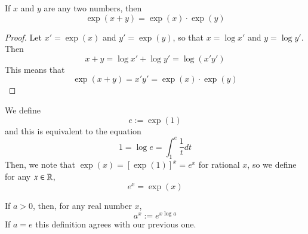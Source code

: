 \documentclass[12pt, a4paper, oneside, openright, titlepage]{book}
\begin{document}
\begin{subappendices}
    \begin{thm}
        If $x$ and $y$ are any two numbers, then \begin{equation*}
            \exp(x+y) = \exp(x)\cdot \exp(y)
        \end{equation*}
    \end{thm}
    \begin{proof}
        Let $x' = \exp(x)$ and $y' = \exp(y)$, so that $x = \log x'$ and $y = \log y'$. Then \begin{equation*}
            x+y = \log x' + \log y' = \log(x'y')
        \end{equation*}
        This means that \begin{equation*}
            \exp(x+y) = x'y' = \exp(x) \cdot \exp(y)
        \end{equation*}
    \end{proof}


    \begin{defn}
        We define \begin{equation}
            e := \exp(1)
        \end{equation}
        and this is equivalent to the equation \begin{equation}
            1 = \log e = \int_1^e\frac{1}{t}dt
        \end{equation}
        Then, we note that $\exp(x) = [\exp(1)]^x = e^x$ for rational $x$, so we define for any $x \in \mathbb R$, \begin{equation}
            e^x =\exp(x)
        \end{equation}
    \end{defn}


    \begin{defn}
        If $a > 0$, then, for any real number $x$, \begin{equation}
            a^x := e^{x\log a}
        \end{equation}
        If $a = e$ this definition agrees with our previous one.
    \end{defn}



\end{subappendices}
\end{document}

